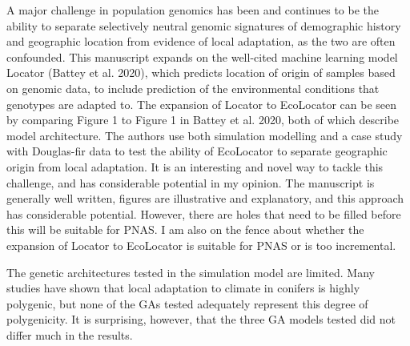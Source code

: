 \begin{point}{} %
A major challenge in population genomics has been and continues to be the ability to separate selectively neutral genomic signatures of demographic history and geographic location from evidence of local adaptation, as the two are often confounded. This manuscript expands on the well-cited machine learning model Locator (Battey et al. 2020), which predicts location of origin of samples based on genomic data, to include prediction of the environmental conditions that genotypes are adapted to. The expansion of Locator to EcoLocator can be seen by comparing Figure 1 to Figure 1 in Battey et al. 2020, both of which describe model architecture. The authors use both simulation modelling and a case study with Douglas-fir data to test the ability of EcoLocator to separate geographic origin from local adaptation. It is an interesting and novel way to tackle this challenge, and has considerable potential in my opinion. The manuscript is generally well written, figures are illustrative and explanatory, and this approach has considerable potential. However, there are holes that need to be filled before this will be suitable for PNAS. I am also on the fence about whether the expansion of Locator to EcoLocator is suitable for PNAS or is too incremental.
\end{point}


\begin{point}{} %
The genetic architectures tested in the simulation model are limited. Many studies have shown that local adaptation to climate in conifers is highly polygenic, but none of the GAs tested adequately represent this degree of polygenicity. It is surprising, however, that the three GA models tested did not differ much in the results.
\end{point}


